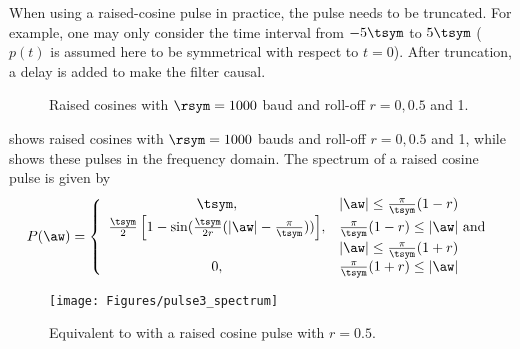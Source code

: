When using a raised-cosine pulse in practice, the pulse needs to be truncated. For example, one may only consider the time interval from $-5 \tsym$ to $5 \tsym$ ($p(t)$ is assumed here to be symmetrical with respect to $t=0$). After truncation, a delay is added to make the filter causal.

\begin{figure}[htbp]
\centering
  \caption[{Raised cosines with $\rsym=1000$ bauds and roll-off $r=0, 0.5$ and $1$.}]{Raised cosines with $\rsym=1000$ baud and roll-off $r=0, 0.5$ and 1.}
  \label{fig:raisedCosines}
\end{figure}

 shows raised cosines with $\rsym=1000$ bauds and roll-off $r=0, 0.5$ and 1, while  shows these pulses in the frequency domain. The spectrum of a raised cosine pulse is given by
\begin{equation}
P(\aw) = \left\{ {
\begin{array}{cl} 
{\tsym,} & {\lvert\aw\rvert \le \frac{\pi}{\tsym}(1-r)} \\ 
{\frac{\tsym}{2}\left[1 - \sin(\frac{\tsym}{2r}(\lvert\aw\rvert-\frac{\pi}{\tsym})) \right]}, & {\frac{\pi}{\tsym}(1-r) \le \lvert\aw\rvert \text{ and}}\\
& {\lvert\aw\rvert\le \frac{\pi}{\tsym}(1+r)} \\ 
{0,} & {\frac{\pi}{\tsym}(1+r) \le \lvert\aw\rvert} \\
\end{array} 
} \right.
\label{eq:raisedCosineSpectrum}
\end{equation}

\begin{figure}[htbp]
\centering
\texttt{[image: Figures/pulse3\_spectrum]}
\caption{Equivalent to  with a raised cosine pulse with $r=0.5$.\label{fig:pulse3_spectrum}}
\end{figure}

